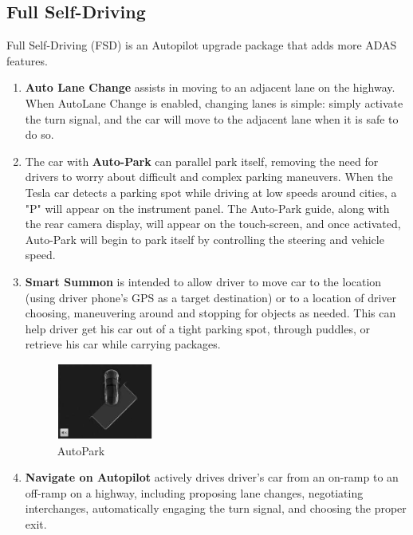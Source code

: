 \documentclass[letterpaper, 10 pt, conference]{ieeeconf}  %
\begin{document}
\subsection{Full Self-Driving}

Full Self-Driving (FSD) is an Autopilot upgrade package that adds more ADAS features\cite{wiki_autopilot}. 

\begin{enumerate}
    \item \textbf{Auto Lane Change} assists in moving to an adjacent lane on the highway. When AutoLane Change is enabled, changing lanes is simple: simply activate the turn signal, and the car will move to the adjacent lane when it is safe to do so.
    
    \item The car with \textbf{Auto-Park} can parallel park itself, removing the need for drivers to worry about difficult and complex parking maneuvers. When the Tesla car detects a parking spot while driving at low speeds around cities, a "P" will appear on the instrument panel. The Auto-Park guide, along with the rear camera display, will appear on the touch-screen, and once activated, Auto-Park will begin to park itself by controlling the steering and vehicle speed\cite{polyarush2019does}.

    \item \textbf{Smart Summon} is intended to allow driver to move car to the location (using driver phone's GPS as a target destination) or to a location of driver choosing, maneuvering around and stopping for objects as needed. This can help driver get his car out of a tight parking spot, through puddles, or retrieve his car while carrying packages\cite{polyarush2019does}.

    \begin{figure}[hbt!]
    \centering
    \includegraphics[width=0.3\textwidth]{gfx/Autopark.jpg}
    \caption{AutoPark}
    \end{figure}
    
    \item \textbf{Navigate on Autopilot} actively drives driver's car from an on-ramp to an off-ramp on a highway, including proposing lane changes, negotiating interchanges, automatically engaging the turn signal, and choosing the proper exit.
\end{enumerate}
\end{document}
